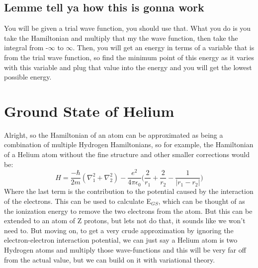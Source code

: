 \documentclass[garamond]{article}
\begin{document}
\subsection{Lemme tell ya how this is gonna work}
You will be given a trial wave function, you should use that. What you do is you take the Hamiltonian and multiply that my the wave function, then take the integral from -$\infty$ to $\infty$. Then, you will get an energy in terms of a variable that is from the trial wave function, so find the minimum point of this energy as it varies with this variable and plug that value into the energy and you will get the lowest possible energy.

\section{Ground State of Helium}
Alright, so the Hamiltonian of an atom can be approximated as being a combination of multiple Hydrogen Hamiltonians, so for example, the Hamiltonian of a Helium atom without the fine structure and other smaller corrections would be:
\begin{equation}
H=\frac{-\hbar}{2m}(\nabla_1^2+\nabla_2^2)-\frac{e^2}{4\pi \epsilon_0}\bigg(\frac{2}{r_1}+\frac{2}{r_2}-\frac{1}{|r_1-r_2|}\bigg)
\end{equation}
Where the last term is the contribution to the potential caused by the interaction of the electrons. This can be used to calculate E$_{GS}$, which can be thought of as the ionization energy to remove the two electrons from the atom. But this can be extended to an atom of Z protons, but lets not do that, it sounds like we won't need to. But moving on, to get a very crude approximation by ignoring the electron-electron interaction potential, we can just say a Helium atom is two Hydrogen atoms and multiply those wave-functions and this will be very far off from the actual value, but we can build on it with variational theory.
\end{document}
